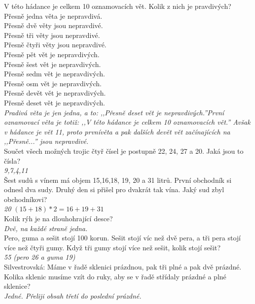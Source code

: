 \begin{multicols}{\value{columnsgames}}
\noindent
V této hádance je celkem 10 oznamovacích vět. Kolik z nich 
je pravdivých?\\
Přesně jedna věta je nepravdivá.\\
Přesně dvě věty jsou nepravdivé.\\
Přesně tři věty jsou nepravdivé.\\
Přesně čtyři věty jsou nepravdivé.\\
Přesně pět vět je nepravdivých.\\
Přesně šest vět je nepravdivých.\\
Přesně sedm vět je nepravdivých.\\
Přesně osm vět je nepravdivých.\\
Přesně devět vět je nepravdivých.\\
Přesně deset vět je nepravdivých.\\[1 mm]
{\sl Pradivá věta je jen jedna, a to: ,,Přesně deset vět je
nepravdivých.''První oznamovací věta je totiž: ,,V této hádance
je celkem 10 oznamovacích vět.'' Avšak v hádance je vět 11,
proto prvnívěta a pak dalších devět vět začínajících na ,,Přesně...''
jsou nepravdivé.}\\

\noindent
Součet všech možných trojic čtyř čísel je postupně 22, 24, 
27 a 20. Jaká jsou to čísla?\\[1 mm]
{\sl 9,7,4,11}\\

\noindent
Šest sudů s vínem má objem 15,16,18, 19, 20 a 31 litrů. První 
obchodník si odnesl dva sudy. Druhý den si přišel pro dvakrát 
tak vína. Jaký sud zbyl obchodníkovi?\\[1 mm]
{\sl 20 $(15+18)*2=16+19+31$}\\

\noindent
Kolik rýh je na dlouhohrající desce?\\[1 mm]
{\sl Dvě, na každé straně jedna.}\\

\noindent
Pero, guma a sešit stojí 100 korun. Sešit stojí víc než dvě 
pera, a tři pera stojí více než čtyři gumy. Když tři gumy stojí 
více než sešit, kolik stojí sešit?\\[1 mm]
{\sl 55 (pero 26 a guma 19)}\\

\noindent
Silvestrovská: Máme v řadě sklenici prázdnou, pak tři plné 
a pak dvě prázdné. Kolika sklenic musíme vzít do ruky, aby se 
v řadě střídaly prázdné a plné sklenice?\\[1 mm]
{\sl Jedné. Přeliji obsah třetí do poslední prázdné.}\\


\end{multicols}
